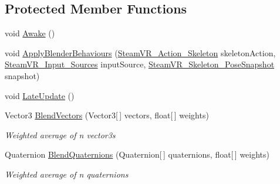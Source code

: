 \subsection*{Protected Member Functions}
\begin{DoxyCompactItemize}
\item 
void \mbox{\hyperlink{class_valve_1_1_v_r_1_1_steam_v_r___skeleton___poser_a814dc0d682cf294b1a81f41a4ae64f74}{Awake}} ()
\item 
void \mbox{\hyperlink{class_valve_1_1_v_r_1_1_steam_v_r___skeleton___poser_a70b791c62e9028d464a30cd48bdc79b8}{Apply\+Blender\+Behaviours}} (\mbox{\hyperlink{class_valve_1_1_v_r_1_1_steam_v_r___action___skeleton}{Steam\+V\+R\+\_\+\+Action\+\_\+\+Skeleton}} skeleton\+Action, \mbox{\hyperlink{namespace_valve_1_1_v_r_a82e5bf501cc3aa155444ee3f0662853f}{Steam\+V\+R\+\_\+\+Input\+\_\+\+Sources}} input\+Source, \mbox{\hyperlink{class_valve_1_1_v_r_1_1_steam_v_r___skeleton___pose_snapshot}{Steam\+V\+R\+\_\+\+Skeleton\+\_\+\+Pose\+Snapshot}} snapshot)
\item 
void \mbox{\hyperlink{class_valve_1_1_v_r_1_1_steam_v_r___skeleton___poser_a86281164f383edd92e20d57a57fafbb5}{Late\+Update}} ()
\item 
Vector3 \mbox{\hyperlink{class_valve_1_1_v_r_1_1_steam_v_r___skeleton___poser_adc9b5a7251967eda89384cd100a12706}{Blend\+Vectors}} (Vector3\mbox{[}$\,$\mbox{]} vectors, float\mbox{[}$\,$\mbox{]} weights)
\begin{DoxyCompactList}\small\item\em Weighted average of n vector3s \end{DoxyCompactList}\item 
Quaternion \mbox{\hyperlink{class_valve_1_1_v_r_1_1_steam_v_r___skeleton___poser_a512976b6887ba7727cdf155de454c467}{Blend\+Quaternions}} (Quaternion\mbox{[}$\,$\mbox{]} quaternions, float\mbox{[}$\,$\mbox{]} weights)
\begin{DoxyCompactList}\small\item\em Weighted average of n quaternions \end{DoxyCompactList}\end{DoxyCompactItemize}
